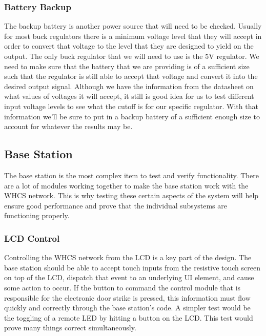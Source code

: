 \subsubsection{Battery Backup}
The backup battery is another power source that will need to be checked.
Usually for most buck regulators there is a minimum voltage level that they
will accept in order to convert that voltage to the level that they are
designed to yield on the output. The only buck regulator that we will need to
use is the 5V regulator. We need to make sure that the battery that we are
providing is of a sufficient size such that the regulator is still able to
accept that voltage and convert it into the desired output signal. Although we
have the information from the datasheet on what values of voltages it will
accept, it still is good idea for us to test different input voltage levels to
see what the cutoff is for our specific regulator. With that information
we{}'ll be sure to put in a backup battery of a sufficient enough size to
account for whatever the results may be.

\subsection{Base Station}
The base station is the most complex item to test and verify functionality.
There are a lot of modules working together to make the base station work with
the WHCS network. This is why testing these certain aspects of the system will
help ensure good performance and prove that the individual subsystems are
functioning properly.

\subsubsection{LCD Control}
Controlling the WHCS network from the LCD is a key part of the design. The base
station should be able to accept touch inputs from the resistive touch screen
on top of the LCD, dispatch that event to an underlying UI element, and cause
some action to occur. If the button to command the control module that is
responsible for the electronic door strike is pressed, this information must
flow quickly and correctly through the base station's code. A simpler test
would be the toggling of a remote LED by hitting a button on the LCD. This test
would prove many things correct simultaneously.

